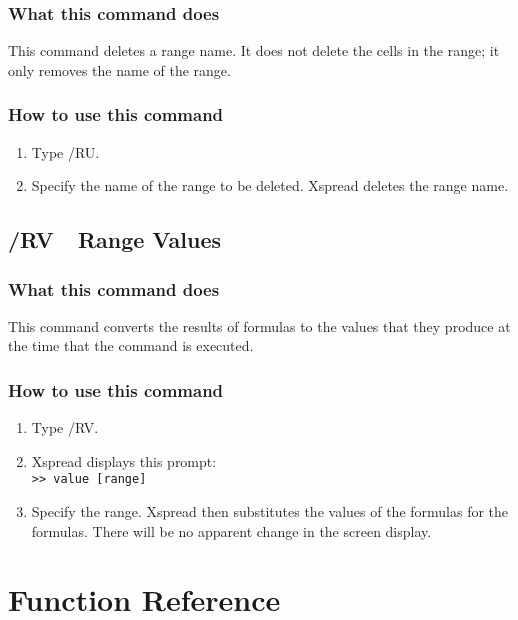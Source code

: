 \subsubsection*{What this command does}
This command deletes a range name.  It does not delete the cells in 
the range; it only removes the name of the range.

\subsubsection*{How to use this command}
\begin{enumerate}
\item{Type /RU.}
\item{Specify the name of the range to be deleted.  Xspread deletes the
        range name.}
\end{enumerate}
        
\subsection*{/RV\ \      Range Values}

\subsubsection*{What this command does}
This command converts the results of formulas to the values that they 
produce at the time that the command is executed.

\subsubsection*{How to use this command}
\begin{enumerate}
\item{Type /RV.}
\item{Xspread displays this prompt:\\
        {\tt >> value [range]} }
        \item{Specify the range.  Xspread then substitutes the values of the
        formulas for the formulas.  There will be no apparent change in
        the screen display.}
\end{enumerate}

\newpage
\section*{Function Reference}

